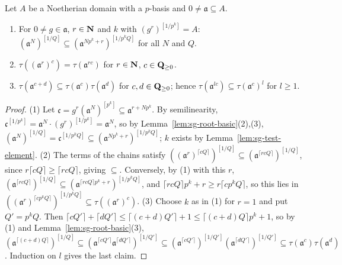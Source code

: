 \begin{lemma}\label{lem:sg-test-subadditive}
\leanok
{}
Let $A$ be a Noetherian domain with a $p$-basis and $0\ne\mathfrak a\subseteq A$.
\begin{enumerate}
\item For $0\ne g\in\mathfrak a$, $r\in\mathbf{N}$ and $k$ with $(g^r)^{[1/p^k]}=A$: $(\mathfrak a^N)^{[1/Q]}\subseteq(\mathfrak a^{Np^k+r})^{[1/p^kQ]}$ for all $N$ and $Q$.
\item $\tau((\mathfrak a^r)^c)=\tau(\mathfrak a^{rc})$ for $r\in\mathbf{N}$, $c\in\mathbf{Q}_{\ge0}$.
\item $\tau(\mathfrak a^{c+d})\subseteq\tau(\mathfrak a^c)\tau(\mathfrak a^d)$ for $c,d\in\mathbf{Q}_{\ge0}$; hence $\tau(\mathfrak a^{lc})\subseteq\tau(\mathfrak a^c)^l$ for $l\ge1$.
\end{enumerate}
\end{lemma}

\begin{proof}
(1) Let $\mathfrak c=g^r(\mathfrak a^N)^{[p^k]}\subseteq\mathfrak a^{r+Np^k}$. By semilinearity, $\mathfrak c^{[1/p^k]}=\mathfrak a^N\cdot(g^r)^{[1/p^k]}=\mathfrak a^N$, so by
Lemma~\ref{lem:sg-root-basic}(2),(3), $(\mathfrak a^N)^{[1/Q]}=\mathfrak c^{[1/p^kQ]}\subseteq(\mathfrak a^{Np^k+r})^{[1/p^kQ]}$; $k$ exists by
Lemma~\ref{lem:sg-test-element}.
(2) The terms of the chains satisfy $((\mathfrak a^r)^{\lceil cQ\rceil})^{[1/Q]}\subseteq(\mathfrak a^{\lceil rcQ\rceil})^{[1/Q]}$, since $r\lceil cQ\rceil\ge\lceil rcQ\rceil$,
giving $\subseteq$. Conversely, by (1) with this $r$, $(\mathfrak a^{\lceil rcQ\rceil})^{[1/Q]}\subseteq(\mathfrak a^{\lceil rcQ\rceil p^k+r})^{[1/p^kQ]}$, and
$\lceil rcQ\rceil p^k+r\ge r\lceil cp^kQ\rceil$, so this lies in $((\mathfrak a^r)^{\lceil cp^kQ\rceil})^{[1/p^kQ]}\subseteq\tau((\mathfrak a^r)^c)$.
(3) Choose $k$ as in (1) for $r=1$ and put $Q'=p^kQ$. Then $\lceil cQ'\rceil+\lceil dQ'\rceil\le\lceil(c+d)Q'\rceil+1\le\lceil(c+d)Q\rceil p^k+1$, so by (1) and
Lemma~\ref{lem:sg-root-basic}(3), $(\mathfrak a^{\lceil(c+d)Q\rceil})^{[1/Q]}\subseteq(\mathfrak a^{\lceil cQ'\rceil}\mathfrak a^{\lceil dQ'\rceil})^{[1/Q']}\subseteq
(\mathfrak a^{\lceil cQ'\rceil})^{[1/Q']}(\mathfrak a^{\lceil dQ'\rceil})^{[1/Q']}\subseteq\tau(\mathfrak a^c)\tau(\mathfrak a^d)$. Induction on $l$ gives the last claim.
\end{proof}

